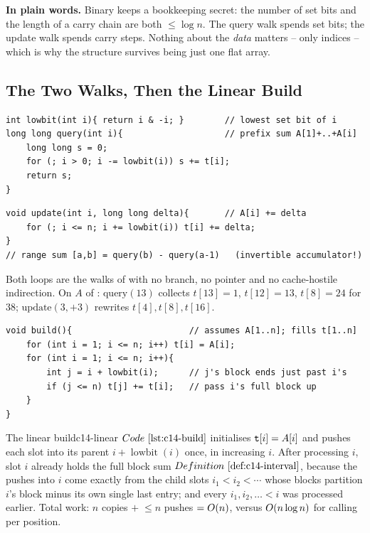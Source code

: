 \noindent\textbf{In plain words.}  Binary keeps a bookkeeping secret: the
number of set bits and the length of a carry chain are both \(\le\log n\).
The query walk spends set bits; the update walk spends carry steps.  Nothing
about the \emph{data} matters -- only indices -- which is why the structure
survives being just one flat array.

\subsection{The Two Walks, Then the Linear Build}

\begin{lstlisting}[caption={reading lowbit, and the prefix walk: sum of A[1..i]}, label={lst:c14-query}]
int lowbit(int i){ return i & -i; }        // lowest set bit of i
long long query(int i){                    // prefix sum A[1]+..+A[i]
    long long s = 0;
    for (; i > 0; i -= lowbit(i)) s += t[i];
    return s;
}
\end{lstlisting}

\begin{lstlisting}[caption={the point-update walk: add delta to A[i] everywhere it is buried}, label={lst:c14-update}]
void update(int i, long long delta){       // A[i] += delta
    for (; i <= n; i += lowbit(i)) t[i] += delta;
}
// range sum [a,b] = query(b) - query(a-1)   (invertible accumulator!)
\end{lstlisting}

Both loops are the walks of  with no branch, no pointer and
no cache-hostile indirection.  On \(A\) of :
\(\text{query}(13)\) collects \(t[13]{=}1\), \(t[12]{=}13\), \(t[8]{=}24\)
for \(38\); \(\text{update}(3,+3)\) rewrites \(t[4],t[8],t[16]\).

\begin{lstlisting}[caption={O(n) build: hand each partial block to the slot whose block extends it}, label={lst:c14-build}]
void build(){                       // assumes A[1..n]; fills t[1..n]
    for (int i = 1; i <= n; i++) t[i] = A[i];
    for (int i = 1; i <= n; i++){
        int j = i + lowbit(i);      // j's block ends just past i's
        if (j <= n) t[j] += t[i];   // pass i's full block up
    }
}
\end{lstlisting}

\begin{proposition}{The linear build}{c14-linear}
\(\coderef{c14-build}\) initialises \(\texttt{t}[i]=A[i]\) and pushes each slot
into its parent \(i{+}\operatorname{lowbit}(i)\) once, in increasing \(i\).
After processing \(i\), slot \(i\) already holds the full block sum
\(\defref{c14-interval}\), because the pushes into \(i\) come exactly from
the child slots \(i_1 < i_2 < \cdots\) whose blocks partition
\(i\)'s block minus its own single last entry; and every \(i_1,i_2,\dots<i\)
was processed earlier.  Total work: \(n\) copies \(+\;\le n\) pushes
\(=O(n)\), versus \(O(n\log n)\) for calling  per
position.
\end{proposition}

